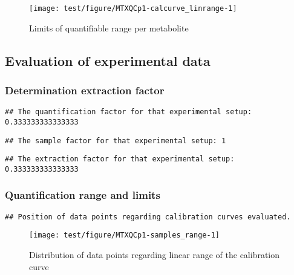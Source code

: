 \documentclass[9pt,]{article}
\begin{document}
\begin{figure}

{\centering \texttt{[image: test/figure/MTXQCp1-calcurve\_linrange-1]} 

}

\caption{Limits of quantifiable range per metabolite}\label{fig:calcurve_linrange}
\end{figure}

\subsection{Evaluation of experimental
data}\label{evaluation-of-experimental-data}

\subsubsection{Determination extraction
factor}\label{determination-extraction-factor}

\begin{verbatim}
## The quantification factor for that experimental setup: 0.333333333333333
\end{verbatim}

\begin{verbatim}
## The sample factor for that experimental setup: 1
\end{verbatim}

\begin{verbatim}
## The extraction factor for that experimental setup: 0.333333333333333
\end{verbatim}

\subsubsection{Quantification range and
limits}\label{quantification-range-and-limits}

\begin{verbatim}
## Position of data points regarding calibration curves evaluated.
\end{verbatim}

\begin{figure}

{\centering \texttt{[image: test/figure/MTXQCp1-samples\_range-1]} 

}

\caption{Distribution of data points regarding linear range of the calibration curve}\label{fig:samples_range}
\end{figure}
\end{document}

